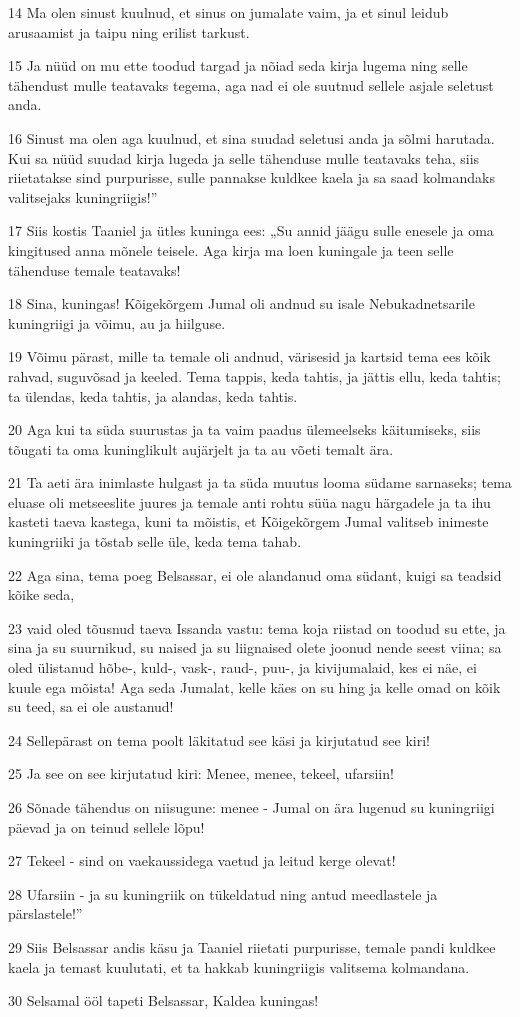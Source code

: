 \par 14 Ma olen sinust kuulnud, et sinus on jumalate vaim, ja et sinul leidub arusaamist ja taipu ning erilist tarkust.
\par 15 Ja nüüd on mu ette toodud targad ja nõiad seda kirja lugema ning selle tähendust mulle teatavaks tegema, aga nad ei ole suutnud sellele asjale seletust anda.
\par 16 Sinust ma olen aga kuulnud, et sina suudad seletusi anda ja sõlmi harutada. Kui sa nüüd suudad kirja lugeda ja selle tähenduse mulle teatavaks teha, siis riietatakse sind purpurisse, sulle pannakse kuldkee kaela ja sa saad kolmandaks valitsejaks kuningriigis!”
\par 17 Siis kostis Taaniel ja ütles kuninga ees: „Su annid jäägu sulle enesele ja oma kingitused anna mõnele teisele. Aga kirja ma loen kuningale ja teen selle tähenduse temale teatavaks!
\par 18 Sina, kuningas! Kõigekõrgem Jumal oli andnud su isale Nebukadnetsarile kuningriigi ja võimu, au ja hiilguse.
\par 19 Võimu pärast, mille ta temale oli andnud, värisesid ja kartsid tema ees kõik rahvad, suguvõsad ja keeled. Tema tappis, keda tahtis, ja jättis ellu, keda tahtis; ta ülendas, keda tahtis, ja alandas, keda tahtis.
\par 20 Aga kui ta süda suurustas ja ta vaim paadus ülemeelseks käitumiseks, siis tõugati ta oma kuninglikult aujärjelt ja ta au võeti temalt ära.
\par 21 Ta aeti ära inimlaste hulgast ja ta süda muutus looma südame sarnaseks; tema eluase oli metseeslite juures ja temale anti rohtu süüa nagu härgadele ja ta ihu kasteti taeva kastega, kuni ta mõistis, et Kõigekõrgem Jumal valitseb inimeste kuningriiki ja tõstab selle üle, keda tema tahab.
\par 22 Aga sina, tema poeg Belsassar, ei ole alandanud oma südant, kuigi sa teadsid kõike seda,
\par 23 vaid oled tõusnud taeva Issanda vastu: tema koja riistad on toodud su ette, ja sina ja su suurnikud, su naised ja su liignaised olete joonud nende seest viina; sa oled ülistanud hõbe-, kuld-, vask-, raud-, puu-, ja kivijumalaid, kes ei näe, ei kuule ega mõista! Aga seda Jumalat, kelle käes on su hing ja kelle omad on kõik su teed, sa ei ole austanud!
\par 24 Sellepärast on tema poolt läkitatud see käsi ja kirjutatud see kiri!
\par 25 Ja see on see kirjutatud kiri: Menee, menee, tekeel, ufarsiin!
\par 26 Sõnade tähendus on niisugune: menee - Jumal on ära lugenud su kuningriigi päevad ja on teinud sellele lõpu!
\par 27 Tekeel - sind on vaekaussidega vaetud ja leitud kerge olevat!
\par 28 Ufarsiin - ja su kuningriik on tükeldatud ning antud meedlastele ja pärslastele!”
\par 29 Siis Belsassar andis käsu ja Taaniel riietati purpurisse, temale pandi kuldkee kaela ja temast kuulutati, et ta hakkab kuningriigis valitsema kolmandana.
\par 30 Selsamal ööl tapeti Belsassar, Kaldea kuningas!

